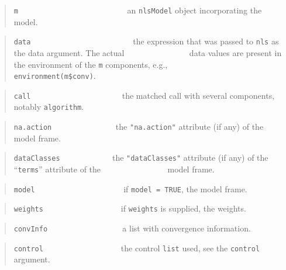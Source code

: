 \documentclass[
]{article}
\begin{document}
\begin{quote}
\texttt{m} ~ ~ ~ ~ ~ ~ ~ ~ ~ ~ ~ ~ ~ ~ ~~ an \texttt{nlsModel} object
incorporating the model.
\end{quote}

\begin{quote}
\texttt{data} ~ ~ ~ ~ ~ ~ ~ ~ ~ ~ ~ ~ ~ ~ ~the expression that was
passed to \texttt{nls} as the data argument. The actual \newline
\(~~~~~~~~~~~~~~~~~~~~~~~~~~~~~~~~~\) data values are present in the
environment of the \texttt{m} components, e.g.,
\newline \(~~~~~~~~~~~~~~~~~~~~~~~~~~~~~~~~~\)
\texttt{environment(m\$conv)}.
\end{quote}

\begin{quote}
\texttt{call} ~ ~ ~ ~ ~ ~ ~ ~ ~ ~ ~ ~ ~ the matched call with several
components, notably \texttt{algorithm}.
\end{quote}

\begin{quote}
\texttt{na.action} ~ ~ ~ ~ ~ ~ ~ ~ ~ the \texttt{"na.action"} attribute
(if any) of the model frame.
\end{quote}

\begin{quote}
\texttt{dataClasses} ~ ~ ~ ~ ~ ~ ~ \(~\)the \texttt{"dataClasses"}
attribute (if any) of the ``\texttt{terms}'' attribute of the \newline
\(~~~~~~~~~~~~~~~~~~~~~~~~~~~~~~~~~~\) model frame.
\end{quote}

\begin{quote}
\texttt{model} ~ ~ ~ ~ ~ ~ ~ ~ ~ ~ ~ ~ ~if \texttt{model\ =\ TRUE}, the
model frame.
\end{quote}

\begin{quote}
\texttt{weights} ~ ~ ~ ~ ~ ~ ~ ~ ~ ~ ~ if \texttt{weights} is supplied,
the weights.
\end{quote}

\begin{quote}
\texttt{convInfo} ~ ~ ~ ~ ~ ~ ~ ~ ~ ~~ a list with convergence
information.
\end{quote}

\begin{quote}
\texttt{control} ~ ~ ~ ~ ~ ~ ~ ~ ~ ~ ~ the control \texttt{list} used,
see the \texttt{control} argument.
\end{quote}
\end{document}
